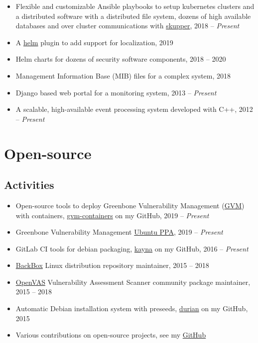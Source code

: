 \documentclass[10pt]{scrartcl}
\begin{document}
\begin{itemize}
\item Flexible and customizable Ansible playbooks to setup kubernetes
clusters and a distributed software with a distributed file system,
dozens of high available databases and over cluster communications
with \href{https://skupper.io/}{skupper}, 2018 -- \emph{Present}

\item A \href{https://helm.sh/}{helm} plugin to add support for localization, 2019

\item Helm charts for dozens of security software components, 2018 -- 2020

\item Management Information Base (MIB) files for a complex system, 2018

\item Django based web portal for a monitoring system, 2013 -- \emph{Present}

\item A scalable, high-available event processing system developed with C++, 2012 -- \emph{Present}
\end{itemize}

\section*{Open-source}
\label{sec:orga8baa21}

\subsection*{Activities}
\label{sec:orgdc75ee4}

\begin{itemize}
\item Open-source tools to deploy Greenbone Vulnerability Management (\href{https://community.greenbone.net/}{GVM})
with containers, \href{https://github.com/admirito/gvm-containers}{gvm-containers} on my GitHub, 2019 -- \emph{Present}

\item Greenbone Vulnerability Management \href{https://launchpad.net/\~mrazavi/+archive/ubuntu/gvm}{Ubuntu PPA}, 2019 -- \emph{Present}

\item GitLab CI tools for debian packaging, \href{https://github.com/admirito/kayna}{kayna} on my GitHub, 2016 -- \emph{Present}

\item \href{https://www.backbox.org/}{BackBox} Linux distribution repository maintainer, 2015 -- 2018

\item \href{https://www.openvas.org/}{OpenVAS} Vulnerability Assessment Scanner community package maintainer, 2015 -- 2018

\item Automatic Debian installation system with preseeds, \href{https://github.com/admirito/durian}{durian} on my GitHub, 2015

\item Various contributions on open-source projects, see my \href{https://github.com/admirito/}{GitHub}
\end{itemize}
\end{document}
